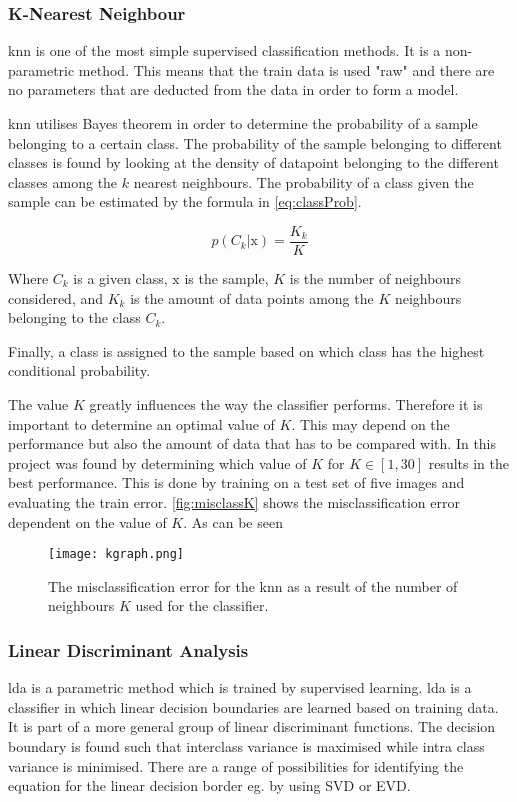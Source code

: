 \subsubsection*{K-Nearest Neighbour}
\gls{knn} is one of the most simple supervised classification methods. It is a non-parametric method. This means that the train data is used "raw" and there are no parameters that are deducted from the data in order to form a model. 
 
\gls{knn} utilises Bayes theorem in order to determine the probability of a sample belonging to a certain class. The probability of the sample belonging to different classes is found by looking at the density of datapoint belonging to the different classes among the $k$ nearest neighbours. The probability of a class given the sample can be estimated by the formula in \autoref{eq:classProb}.

 \begin{equation}\label{eq:classProb}
	p(C_k|\text{x})=\frac{K_k}{K}
\end{equation}

Where $C_k$ is a given class, $\text{x}$ is the sample, $K$ is the number of neighbours considered, and $K_k$ is the amount of data points among the $K$ neighbours belonging to the class $C_k$.

Finally, a class is assigned to the sample based on which class has the highest conditional probability.

The value $K$ greatly influences the way the classifier performs. Therefore it is important to determine an optimal value of $K$. This may depend on the performance but also the amount of data that has to be compared with. In this project was found by determining which value of $K$ for $K\in[1,30]$ results in the best performance. This is done by training on a test set of five images and evaluating the train error. \autoref{fig:misclassK} shows the misclassification error dependent on the value of $K$. As can be seen 
 \begin{figure}[h]
\centering
\texttt{[image: kgraph.png]}
\caption{The misclassification error for the \gls{knn} as a result of the number of neighbours $K$ used for the classifier.}
\label{fig:misclassK}
\end{figure}
\subsubsection*{Linear Discriminant Analysis}
\gls{lda} is a parametric method which is trained by supervised learning. \gls{lda} is a classifier in which linear decision boundaries are learned based on training data. It is part of a more general group of linear discriminant functions. The decision boundary is found such that interclass variance is maximised while intra class variance is minimised. There are a range of possibilities for identifying the equation for the linear decision border eg. by using SVD or EVD.    

